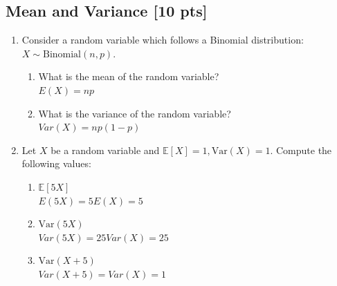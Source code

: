 \documentclass[a4paper]{article}
\theoremstyle{definition}
\newcommand{\Var}{\mathrm{Var}}
\newenvironment{soln}{
	\leavevmode\color{blue}\ignorespaces
}{}
\begin{document}
	\subsection{Mean and Variance [10 pts]}
	\begin{enumerate}
		\item Consider a random variable which follows a Binomial
		distribution: $X \sim \text{Binomial}(n, p)$.
		\begin{enumerate}
			\item What is the mean of the random variable?\\
			\begin{soln}  $E(X) = np$ \end{soln}
			\item What is the variance of the random variable?\\
			\begin{soln}  $Var(X) = np(1-p)$ \end{soln}
		\end{enumerate}
		
		\item Let $X$ be a random variable and
		$\mathbb{E}[X] = 1, \Var(X) = 1$. Compute the following values:
		\begin{enumerate}
			\item $\mathbb{E}[5X]$\\
			\begin{soln}  $E(5X) = 5E(X) = 5$ \end{soln}
			\item $\Var(5X)$\\
			\begin{soln}  $Var(5X) = 25Var(X) = 25$ \end{soln}
			\item $\Var(X+5)$\\
			\begin{soln}  $Var(X+5) = Var(X) = 1$ \end{soln}
		\end{enumerate}
	\end{enumerate}
	
	
\end{document}
